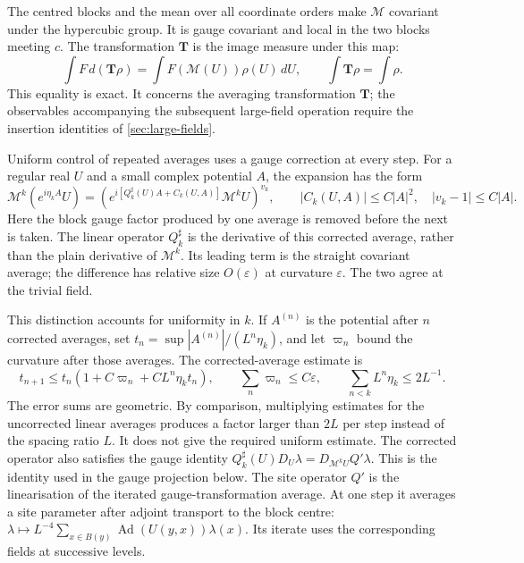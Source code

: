 \documentclass[11pt,letterpaper,reqno]{amsart}
\theoremstyle{definition}
\theoremstyle{remark}
\begin{document}
The centred blocks and the mean over all coordinate orders make
$\mathcal M$ covariant under the hypercubic group. It is gauge
covariant and local in the two blocks meeting $c$.
The transformation $\mathbf T$ is the image measure under this map:
\[
 \int F\,d(\mathbf T\rho)
 =\int F(\mathcal M(U))\rho(U)\,dU,
 \qquad \int\mathbf T\rho=\int\rho.
\]
This equality is exact. It concerns the averaging transformation
$\mathbf T$; the observables accompanying the subsequent large-field
operation require the insertion identities of
\cref{sec:large-fields}.

Uniform control of repeated averages uses a gauge correction at every
step. For a regular real $U$ and a small complex potential $A$, the
expansion has the form
\begin{equation}\label{eq:rg-straightening}
 \mathcal M^k(e^{i\eta_kA}U)
 =\left(e^{i[Q_k^\sharp(U)A+C_k(U,A)]}
                   \mathcal M^kU\right)^{v_k},
 \qquad |C_k(U,A)|\le C|A|^2,
 \quad |v_k-1|\le C|A|.
\end{equation}
Here the block gauge factor produced by one average is removed before
the next is taken. The linear operator $Q_k^\sharp$ is the derivative
of this corrected average, rather than the plain derivative of
$\mathcal M^k$. Its leading term is the straight covariant average;
the difference has relative size $O(\varepsilon)$ at curvature
$\varepsilon$. The two agree at the trivial field.

This distinction accounts for uniformity in $k$. If $A^{(n)}$ is the
potential after $n$ corrected averages, set
$t_n=\sup|A^{(n)}|/(L^n\eta_k)$, and let $\varpi_n$ bound the
curvature after those averages. The corrected-average estimate is
\[
 t_{n+1}\le t_n(1+C\varpi_n+CL^n\eta_kt_n),
 \qquad \sum_n\varpi_n\le C\varepsilon,
 \qquad \sum_{n<k}L^n\eta_k\le 2L^{-1}.
\]
The error sums are geometric. By comparison, multiplying estimates for
the uncorrected linear averages produces a factor larger than $2L$
per step instead of the spacing ratio $L$. It does not give the
required uniform estimate. The corrected operator also satisfies the
gauge identity
$Q_k^\sharp(U)D_U\lambda
=D_{\mathcal M^kU}Q'\lambda$.
This is the identity used in the gauge projection below.
The site operator $Q'$ is the linearisation of the iterated
gauge-transformation average. At one step it averages a site
parameter after adjoint transport to the block centre:
$\lambda\mapsto L^{-4}\sum_{x\in B(y)}
\operatorname{Ad}(U(y,x))\lambda(x)$. Its iterate uses the
corresponding fields at successive levels.
\end{document}
